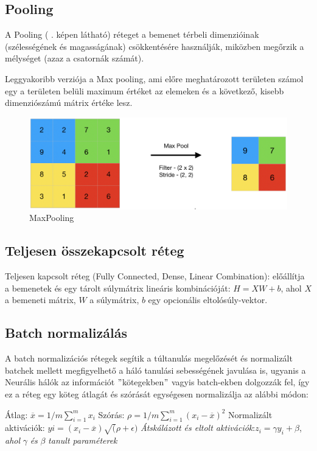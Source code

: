 \documentclass[12pt,oneside,a4paper]{article}
\theoremstyle{remark}
\begin{document}
\subsection{Pooling}\label{subsec:pooling}
A Pooling  ( . képen látható) réteget a bemenet térbeli dimenzióinak (szélességének és magasságának)
csökkentésére használják,
miközben megőrzik a mélységet (azaz a csatornák számát).

Leggyakoribb verziója a Max pooling, ami előre meghatározott területen számol egy a területen belüli maximum értéket az
elemeken és a következő, kisebb dimenziószámú mátrix értéke lesz.

\begin{figure}[h]
\centering
\includegraphics[width=0.75\linewidth]{Screenshot-2019-07-21-at-2.57.13-AM}
\caption{\label{fig:Pooling}MaxPooling}
\end{figure}

\subsection{Teljesen összekapcsolt réteg}\label{subsec:teljesen-osszekapcsolt-reteg}

Teljesen kapcsolt réteg (Fully Connected, Dense, Linear Combination): előállítja a bemenetek és egy tárolt
súlymátrix lineáris kombinációját:
 $H=XW+b$, ahol $X$ a bemeneti mátrix, $W$ a súlymátrix, $b$ egy opcionális eltolósúly-vektor.

\subsection{Batch normalizálás}\label{subsec:batch-normalizalas}

A batch normalizációs rétegek segítik a túltanulás megelőzését és normalizált batchek mellett megfigyelhető a háló
tanulási sebességének javulása is, ugyanis a Neurális hálók az információt \("\)kötegekben\("\) vagyis batch-ekben dolgozzák fel,
így ez a réteg egy köteg átlagát és szórását egységesen normalizálja az alábbi módon:

\noindent Átlag: $\overline{x} = 1/m \displaystyle\sum_{i=1}^{m} x_i$  \newline
Szórás: $\rho = 1/m \displaystyle\sum_{i=1}^{m} (x_i - \overline{x})^2 $\newline
Normalizált aktivációk: $yi = (x_i - \overline{x}) \sqrt(\rho + \epsilon)$ \newline
\newline
\textit{Átskálázott és eltolt aktivációk}:$ z_i = \gamma y_i + \beta $,
\textit{ahol} $\gamma$ \textit{és} $\beta$  \textit{tanult paraméterek}
\newpage
\end{document}
